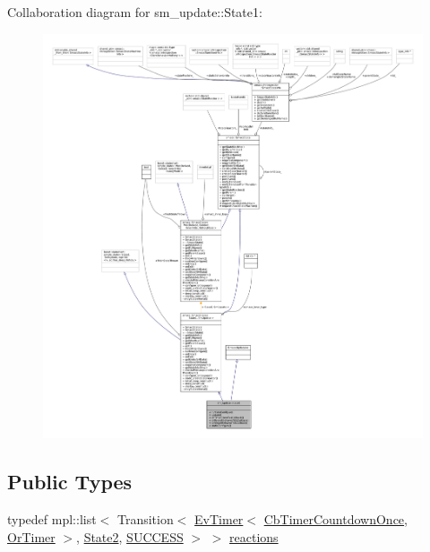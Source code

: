 Collaboration diagram for sm\+\_\+update\+:\+:State1\+:
\nopagebreak
\begin{figure}[H]
\begin{center}
\leavevmode
\includegraphics[width=350pt]{structsm__update_1_1State1__coll__graph}
\end{center}
\end{figure}
\subsection*{Public Types}
\begin{DoxyCompactItemize}
\item 
typedef mpl\+::list$<$ Transition$<$ \hyperlink{structcl__ros__timer_1_1EvTimer}{Ev\+Timer}$<$ \hyperlink{classcl__ros__timer_1_1CbTimerCountdownOnce}{Cb\+Timer\+Countdown\+Once}, \hyperlink{classsm__update_1_1OrTimer}{Or\+Timer} $>$, \hyperlink{structsm__update_1_1State2}{State2}, \hyperlink{structsmacc_1_1default__transition__tags_1_1SUCCESS}{S\+U\+C\+C\+E\+SS} $>$ $>$ \hyperlink{structsm__update_1_1State1_afecf0d56718ca6d3f567b2abf23641d8}{reactions}
\end{DoxyCompactItemize}
